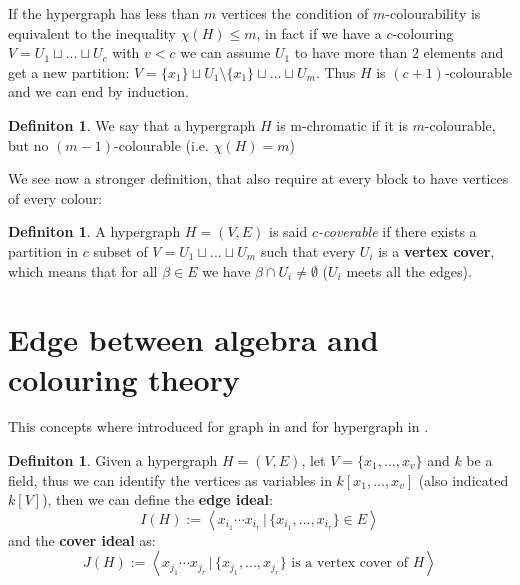 \documentclass[notitlepage, a4]{book}
\theoremstyle{plain}
\theoremstyle{remark}
\theoremstyle{definition}
\newtheorem{deff}[teo]{Definiton}
\begin{document}
If the hypergraph has less than $ m $ vertices the condition of $ m $-colourability is equivalent to the inequality $ \chi(H) \leq m $, in fact if we have a $ c $-colouring $ V = U_1 \sqcup ... \sqcup U_c $ with $ v < c $ we can assume $ U_1 $ to have more than $ 2 $ elements and get a new partition: $ V = \{x_1\} \sqcup U_1 \setminus \{x_1\} \sqcup ... \sqcup U_m $. Thus $ H $ is $ (c+1) $-colourable and we can end by induction.

\begin{deff}
We say that a hypergraph $ H $ is m-chromatic if it is $ m $-colourable, but no $ (m-1) $-colourable (i.e. $\chi(H) = m  $)
\end{deff}

We see now a stronger definition, that also require at every block to have vertices of every colour:

\begin{deff} \label{def:cover}
A hypergraph $ H = (V,E) $ is said \textit{$ c $-coverable} if there exists a partition in $ c $ subset of $ V = U_1 \sqcup ... \sqcup U_m $ such that every $ U_i $ is a \textbf{vertex cover}, which means  that for all $ \beta \in E $ we have $ \beta \cap U_i \neq \emptyset $ ($ U_i $ meets all the edges). 
\end{deff}

\section{Edge between algebra and colouring theory}


This concepts where introduced for graph in \cite{Villa90} and for hypergraph in \cite{Ha08}.

\begin{deff}\label{def:edgecoverideal}
Given a hypergraph $ H = (V,E) $, let $ V = \{ x_1 , ... , x_v \} $ and $ k $ be a field, thus we can identify the vertices as variables in $ k[x_1 , ... , x_v] $ (also indicated $ k[V] $), then we can define the \textbf{edge ideal}:
\begin{equation}\label{eq:edgeideal}
I(H) := \left\langle x_{i_1} \cdots x_{i_r} \,|\, \{ x_{i_1} , ... , x_{i_r}\} \in E \right\rangle 
\end{equation}
and the \textbf{cover ideal} as:
\begin{equation}\label{eq:coverideal}
J(H) := \left\langle x_{j_1} \cdots x_{j_r} \,|\, \{ x_{j_1} , ... , x_{j_r}\} \text{ is a vertex cover of } H \right\rangle 
\end{equation}
\end{deff}
\end{document}
